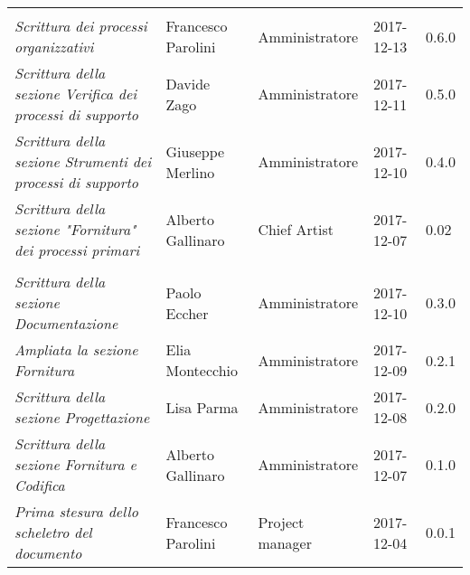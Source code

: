 \newpage 
\section*{}
\begin{table}[H]
	\centering
	\begin{tabular}{p{4cm}|C{3cm}|C{3cm}|R{2.5cm}|R{2cm}}
		
		 & & & & \\
		
		
		\emph{Scrittura dei processi organizzativi} & Francesco Parolini & Amministratore & 2017-12-13 & 0.6.0 \\
		\hline
		
		\emph{Scrittura della sezione Verifica dei processi di supporto} & Davide Zago & Amministratore & 2017-12-11 & 0.5.0 \\
		\hline
		
		\emph{Scrittura della sezione Strumenti dei processi di supporto} & Giuseppe Merlino & Amministratore & 2017-12-10 & 0.4.0 \\
		\hline
		\emph{Scrittura della sezione "Fornitura" dei processi primari} & Alberto Gallinaro & Chief Artist & 2017-12-07 & 0.02 \\
		& & & & \\
		
		\emph{Scrittura della sezione Documentazione}& Paolo Eccher & Amministratore & 2017-12-10 & 0.3.0 \\
		\hline
		
		\emph{Ampliata la sezione Fornitura}& Elia Montecchio & Amministratore & 2017-12-09 & 0.2.1 \\
		\hline
		
		\emph{Scrittura della sezione Progettazione} & Lisa Parma & Amministratore & 2017-12-08 & 0.2.0 \\
		\hline
		
				
		\emph{Scrittura della sezione Fornitura e Codifica} & Alberto Gallinaro & Amministratore & 2017-12-07 & 0.1.0 \\
		\hline
		
		\emph{Prima stesura dello scheletro del documento} & Francesco Parolini & Project manager & 2017-12-04 & 0.0.1 \\
	

	\end{tabular}
	
\end{table}


\clearpage